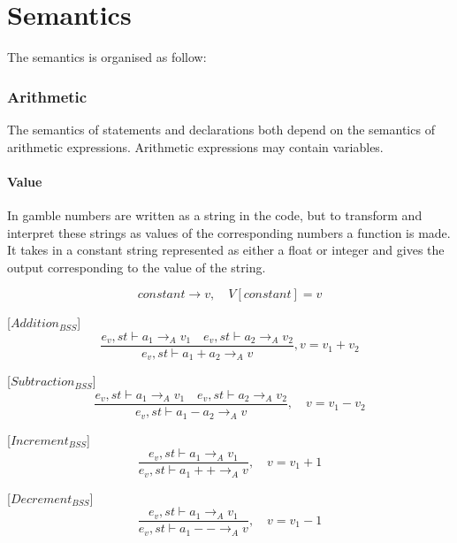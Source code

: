 \chapter{Semantics}\label{app:semantics}
The semantics is organised as follow:

\subsection*{Arithmetic}
The semantics of statements and declarations both depend on the semantics of arithmetic expressions.
Arithmetic expressions may contain variables.

\subsubsection{Value}
In \gls{gamble} numbers are written as a string in the code, but to transform and interpret these strings as values of the corresponding numbers a function is made.
It takes in a constant string represented as either a float or integer and gives the output corresponding to the value of the string.

\begin{equation}
constant\rightarrow v,\quad V[constant]=v
\end{equation}

[${Addition}_{BSS}$]
\begin{equation}
	\frac { { e }_{ v },st\vdash { a }_{ 1 }{ \rightarrow  }_{ A }{ v }_{ 1 }\quad { e }_{ v },st\vdash { a }_{ 2 }{ \rightarrow  }_{ A }{ v }_{ 2 } }{ { e }_{ v },st\vdash { a }_{ 1 }+{ a }_{ 2 }{ \rightarrow  }_{ A }{ v } } , v = { v }_{ 1 }+{ v }_{ 2 }
\end{equation}

[${Subtraction}_{BSS}$]
\begin{equation}
	\frac { { e }_{ v },st\vdash { a }_{ 1 }{ \rightarrow  }_{ A }{ v }_{ 1 }\quad { e }_{ v },st\vdash { a }_{ 2 }{ \rightarrow  }_{ A }{ v }_{ 2 } }{ { e }_{ v },st\vdash { a }_{ 1 }-{ a }_{ 2 }{ \rightarrow  }_{ A }{ v } } ,\quad v={ v }_{ 1 }-{ v }_{ 2 }
\end{equation}

[${Increment}_{BSS}$]
\begin{equation}
\frac { { e }_{ v },st\vdash { a }_{ 1 }{ \rightarrow  }_{ A }{ v }_{ 1 } }{ { e }_{ v },st\vdash { a }_{ 1 }++{ \rightarrow  }_{ A }{ v } } ,\quad v={ v }_{ 1 }+1
\end{equation}

[${Decrement}_{BSS}$]
\begin{equation}
	\frac { { e }_{ v },st\vdash { a }_{ 1 }{ \rightarrow  }_{ A }{ v }_{ 1 } }{ { e }_{ v },st\vdash { a }_{ 1 }--{ \rightarrow  }_{ A }{ v } } ,\quad v={ v }_{ 1 }-1
\end{equation}

